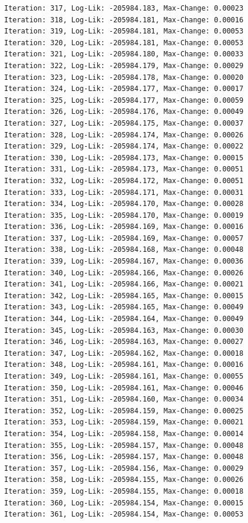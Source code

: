 \documentclass[
  letterpaper,
  DIV=11,
  numbers=noendperiod]{scrreport}
\begin{document}
\begin{verbatim}
Iteration: 317, Log-Lik: -205984.183, Max-Change: 0.00023
Iteration: 318, Log-Lik: -205984.181, Max-Change: 0.00016
Iteration: 319, Log-Lik: -205984.181, Max-Change: 0.00053
Iteration: 320, Log-Lik: -205984.181, Max-Change: 0.00053
Iteration: 321, Log-Lik: -205984.180, Max-Change: 0.00033
Iteration: 322, Log-Lik: -205984.179, Max-Change: 0.00029
Iteration: 323, Log-Lik: -205984.178, Max-Change: 0.00020
Iteration: 324, Log-Lik: -205984.177, Max-Change: 0.00017
Iteration: 325, Log-Lik: -205984.177, Max-Change: 0.00059
Iteration: 326, Log-Lik: -205984.176, Max-Change: 0.00049
Iteration: 327, Log-Lik: -205984.175, Max-Change: 0.00037
Iteration: 328, Log-Lik: -205984.174, Max-Change: 0.00026
Iteration: 329, Log-Lik: -205984.174, Max-Change: 0.00022
Iteration: 330, Log-Lik: -205984.173, Max-Change: 0.00015
Iteration: 331, Log-Lik: -205984.173, Max-Change: 0.00051
Iteration: 332, Log-Lik: -205984.172, Max-Change: 0.00051
Iteration: 333, Log-Lik: -205984.171, Max-Change: 0.00031
Iteration: 334, Log-Lik: -205984.170, Max-Change: 0.00028
Iteration: 335, Log-Lik: -205984.170, Max-Change: 0.00019
Iteration: 336, Log-Lik: -205984.169, Max-Change: 0.00016
Iteration: 337, Log-Lik: -205984.169, Max-Change: 0.00057
Iteration: 338, Log-Lik: -205984.168, Max-Change: 0.00048
Iteration: 339, Log-Lik: -205984.167, Max-Change: 0.00036
Iteration: 340, Log-Lik: -205984.166, Max-Change: 0.00026
Iteration: 341, Log-Lik: -205984.166, Max-Change: 0.00021
Iteration: 342, Log-Lik: -205984.165, Max-Change: 0.00015
Iteration: 343, Log-Lik: -205984.165, Max-Change: 0.00049
Iteration: 344, Log-Lik: -205984.164, Max-Change: 0.00049
Iteration: 345, Log-Lik: -205984.163, Max-Change: 0.00030
Iteration: 346, Log-Lik: -205984.163, Max-Change: 0.00027
Iteration: 347, Log-Lik: -205984.162, Max-Change: 0.00018
Iteration: 348, Log-Lik: -205984.161, Max-Change: 0.00016
Iteration: 349, Log-Lik: -205984.161, Max-Change: 0.00055
Iteration: 350, Log-Lik: -205984.161, Max-Change: 0.00046
Iteration: 351, Log-Lik: -205984.160, Max-Change: 0.00034
Iteration: 352, Log-Lik: -205984.159, Max-Change: 0.00025
Iteration: 353, Log-Lik: -205984.159, Max-Change: 0.00021
Iteration: 354, Log-Lik: -205984.158, Max-Change: 0.00014
Iteration: 355, Log-Lik: -205984.157, Max-Change: 0.00048
Iteration: 356, Log-Lik: -205984.157, Max-Change: 0.00048
Iteration: 357, Log-Lik: -205984.156, Max-Change: 0.00029
Iteration: 358, Log-Lik: -205984.155, Max-Change: 0.00026
Iteration: 359, Log-Lik: -205984.155, Max-Change: 0.00018
Iteration: 360, Log-Lik: -205984.154, Max-Change: 0.00015
Iteration: 361, Log-Lik: -205984.154, Max-Change: 0.00053

\end{verbatim}
\end{document}
